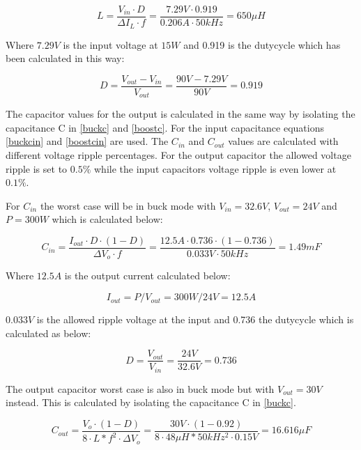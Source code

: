 \begin{equation}\label{buckind}
L = \frac{V_{in}\cdot D}{\Delta I_L\cdot f}= \frac{7.29V\cdot 0.919}{0.206A\cdot 50kHz} = 650\mu H
\end{equation}

Where $7.29V$ is the input voltage at $15W$ and 0.919 is the dutycycle which has been calculated in this way:

\begin{equation} \label{boostD}
D = \frac{V_{out}-V_{in}}{V_{out}} = \frac{90V-7.29V}{90V} = 0.919
\end{equation} 

The capacitor values for the output is calculated in the same way by isolating the capacitance C in \ref{buckc} and \ref{boostc}. For the input capacitance equations \ref{buckcin} and \ref{boostcin} are used.
The $C_{in}$ and $C_{out}$ values are calculated with different voltage ripple percentages. For the output capacitor the allowed voltage ripple is set to $0.5\%$ while the input capacitors voltage ripple is even lower at $0.1\%$. 

For $C_{in}$ the worst case will be in buck mode with $V_{in}=32.6V$, $V_{out}=24V$ and $P=300W$ which is calculated below:

\begin{equation}
C_{in} = \frac{I_{out}\cdot D\cdot (1-D)}{\Delta V_o\cdot f} = \frac{12.5A\cdot 0.736\cdot (1-0.736)}{0.033V\cdot 50kHz} = 1.49mF
\end{equation}  

Where $12.5A$ is the output current calculated below:

\begin{equation}
I_{out} = P/V_{out} = 300W/24V = 12.5A
\end{equation}

$0.033V$ is the allowed ripple voltage at the input and 0.736 the dutycycle which is calculated as below:

\begin{equation} \label{buckduty}
D = \frac{V_{out}}{V_{in}} = \frac{24V}{32.6V} = 0.736
\end{equation} 


The output capacitor worst case is also in buck mode but with $V_{out}=30V$  instead. This is calculated by isolating the capacitance C in \ref{buckc}. 

\begin{equation} \label{buckc} 
C_{out} =\frac{V_{o}\cdot (1-D)}{8\cdot L*f^2\cdot \Delta V_o} = \frac{30V\cdot (1-0.92)}{8\cdot 48\mu H*50kHz^2\cdot 0.15V} = 16.616\mu F
\end{equation}

